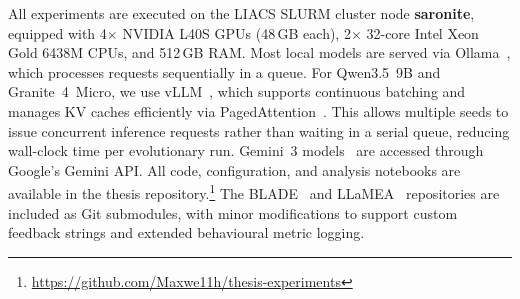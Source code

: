 All experiments are executed on the LIACS SLURM cluster node \textbf{saronite}, equipped with 4$\times$ NVIDIA L40S GPUs (48\,GB each), 2$\times$ 32-core Intel Xeon Gold 6438M CPUs, and 512\,GB RAM. Most local models are served via Ollama~\cite{ollama}, which processes requests sequentially in a queue. For Qwen3.5~9B and Granite~4~Micro, we use vLLM~\cite{kwon2023vllm}, which supports continuous batching and manages KV caches efficiently via PagedAttention~\cite{kwon2023vllm}. This allows multiple seeds to issue concurrent inference requests rather than waiting in a serial queue, reducing wall-clock time per evolutionary run. Gemini~3 models~\cite{gemini3pro, gemini3flash} are accessed through Google's Gemini API. All code, configuration, and analysis notebooks are available in the thesis repository.\footnote{\url{https://github.com/Maxwe11h/thesis-experiments}} The BLADE~\cite{vanStein2025BLADE} and LLaMEA~\cite{vanStein2024LLaMEA} repositories are included as Git submodules, with minor modifications to support custom feedback strings and extended behavioural metric logging.
